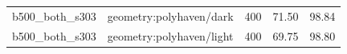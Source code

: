 \begin{longtable}{l>{\raggedright\arraybackslash}p{.42\linewidth}rrr}
b500\_\allowbreak{}both\_\allowbreak{}s303 & %
geometry:polyhaven/dark & %
400 & %
71.50 & %
98.84 \\ %

b500\_\allowbreak{}both\_\allowbreak{}s303 & %
geometry:polyhaven/light & %
400 & %
69.75 & %
98.80 \\ %


\end{longtable}
